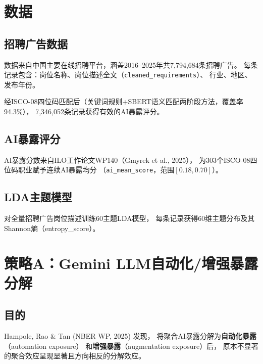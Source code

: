 \documentclass[12pt,a4paper]{ctexart}
\begin{document}
\section{数据}
\label{sec:data}

\subsection{招聘广告数据}

数据来自中国主要在线招聘平台，涵盖2016--2025年共7,794,684条招聘广告。
每条记录包含：岗位名称、岗位描述全文（\texttt{cleaned\_requirements}）、
行业、地区、发布年份。

经ISCO-08四位码匹配后（关键词规则+SBERT语义匹配两阶段方法，覆盖率94.3\%），
7,346,052条记录获得有效的AI暴露评分。

\subsection{AI暴露评分}

AI暴露分数来自ILO工作论文WP140（Gmyrek et al., 2025），
为303个ISCO-08四位码职业赋予连续AI暴露均分
（\texttt{ai\_mean\_score}，范围$[0.18, 0.70]$）。

\subsection{LDA主题模型}

对全量招聘广告岗位描述训练60主题LDA模型，
每条记录获得60维主题分布及其Shannon熵（entropy\_score）。


\section{策略A：Gemini LLM自动化/增强暴露分解}
\label{sec:strategy_a}

\subsection{目的}

Hampole, Rao \& Tan (NBER WP, 2025) 发现，
将聚合AI暴露分解为\textbf{自动化暴露}（automation exposure）
和\textbf{增强暴露}（augmentation exposure）后，
原本不显著的聚合效应呈现显著且方向相反的分解效应。
\end{document}
